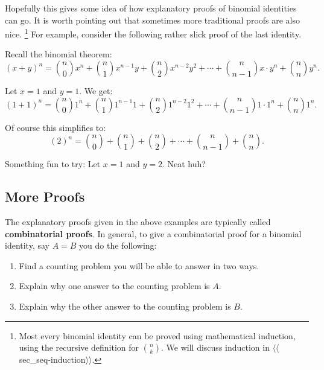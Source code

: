 \documentclass[10pt,]{book}
\newcommand{\terminology}[1]{\textbf{#1}}
\theoremstyle{plain}
\theoremstyle{definition}
\theoremstyle{definition}
\theoremstyle{definition}
\numberwithin{equation}{section}
\begin{document}
      Hopefully this gives some idea of how explanatory proofs of binomial identities can go. It is worth pointing out that sometimes more traditional proofs are also nice.
      \footnote{Most every binomial identity can be proved using mathematical induction, using the recursive definition for \({n \choose k}\). We will discuss induction in
        {$\langle\langle$sec_seq-induction$\rangle\rangle$}.\label{fn-3}} For example, consider the following rather slick proof of the last identity.
\par

      Recall the binomial theorem:
      \begin{equation*}
        (x + y)^n = {n \choose 0}x^n + {n \choose 1}x^{n-1}y + {n \choose 2}x^{n-2}y^2 + \cdots + {n \choose n-1}x\cdot y^n + {n \choose n}y^n.
      \end{equation*}
\par

      Let \(x = 1\) and \(y = 1\). We get:
      \begin{equation*}
        (1 + 1)^n = {n \choose 0}1^n + {n \choose 1}1^{n-1}1 + {n \choose 2}1^{n-2}1^2 + \cdots + {n \choose n-1}1\cdot 1^n + {n \choose n}1^n.
      \end{equation*}
\par

      Of course this simplifies to:
      \begin{equation*}
        (2)^n = {n \choose 0} + {n \choose 1} + {n \choose 2} + \cdots + {n \choose n-1} + {n \choose n}.
      \end{equation*}
\par

      Something fun to try: Let \(x = 1\) and \(y = 2\). Neat huh?
\typeout{************************************************}
\typeout{************************************************}
\subsection[More Proofs]{More Proofs}\label{subsec_moreProofs}

      The explanatory proofs given in the above examples are typically called \terminology{combinatorial proofs}. In general, to give a combinatorial proof for a binomial identity, say \(A = B\) you do the following:
\leavevmode%
\begin{enumerate}
\item\hypertarget{li-522}{}
      Find a counting problem you will be able to answer in two ways.
\item\hypertarget{li-523}{}
      Explain why one answer to the counting problem is \(A\).
\item\hypertarget{li-524}{}
      Explain why the other answer to the counting problem is \(B\).
\end{enumerate}
\par
\end{document}
